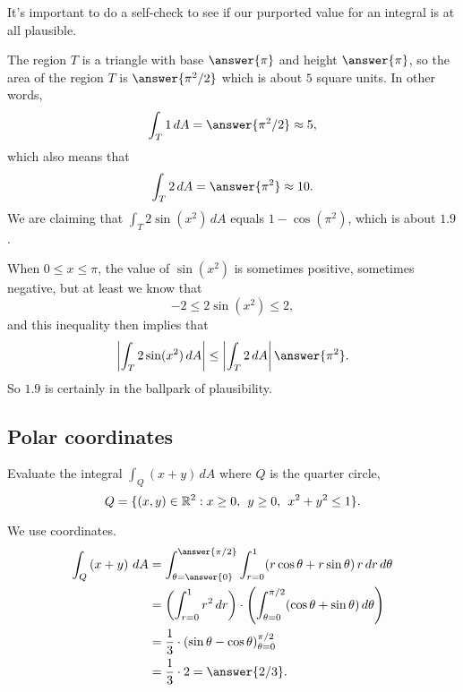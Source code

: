 \documentclass{ximera}
\begin{document}
\begin{question}
  It's important to do a self-check to see if our purported value for
  an integral is at all plausible.

  The region $T$ is a triangle with base $\answer{\pi}$ and height
  $\answer{\pi}$, so the area of the region $T$ is $\answer{\pi^2/2}$
  which is about $5$ square units.  In other words,
  \[
    \int_T 1 \, dA = \answer{\pi^2/2} \approx 5,
  \]
  which also means that
  \[
    \int_T 2 \, dA = \answer{\pi^2} \approx 10.
  \]
  We are claiming that $\int_T 2 \sin (x^2) \, dA$ equals
  $1 - \cos (\pi^2)$, which is about $1.9$.

  When $0 \leq x \leq \pi$, the value of $\sin (x^2)$ is sometimes
  positive, sometimes negative, but at least we know that
  \[
    -2 \leq 2 \sin (x^2) \leq 2,
  \]
  and this inequality then implies that
  \[
    \left| \int_T 2 \sin (x^2) \, dA \right| \leq \left| \int_T 2 \, dA \right| \answer{\pi^2}.
  \]
  So $1.9$ is certainly in the ballpark of plausibility.
\end{question}

\subsection{Polar coordinates}

\begin{example}
  Evaluate the integral $\int_Q \left(x + y\right) \, dA$ where $Q$ is the quarter circle,
  \[
    Q = \{ (x,y) \in \mathbb R^2 : x \geq 0,\hspace{1ex} y \geq 0,\hspace{1ex} x^2 + y^2 \leq 1 \}.
  \]

  \begin{explanation}
    We use  coordinates.
    \begin{align*}
      \int_Q \left(x + y\right) \, dA
      &= \int_{\theta=\answer{0}}^{\answer{\pi/2}} \int_{r=0}^{1} (r \cos \theta + r \sin \theta) \, r \, dr \, d\theta \\  
      &= \left( \int_{r=0}^{1} r^2 \, dr \right) \cdot \left( \int_{\theta=0}^{\pi/2} (\cos \theta + \sin \theta) \, d\theta \right) \\  
      &= \frac{1}{3}  \cdot \left(\sin \theta - \cos \theta\right)_{\theta=0}^{\pi/2} \\
      &= \frac{1}{3} \cdot 2 = \answer{2/3}.
    \end{align*}
  \end{explanation}
\end{example}
\end{document}
